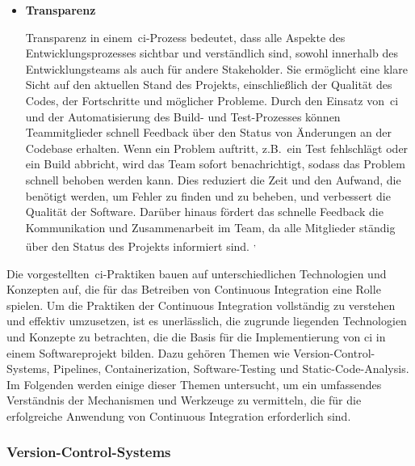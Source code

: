 \begin{itemize}
    \item {
        \textbf{Transparenz}\par
        Transparenz in einem\ \acrshort{ci}-Prozess bedeutet, dass alle Aspekte des Entwicklungsprozesses sichtbar und
        verständlich sind, sowohl innerhalb des Entwicklungsteams als auch für andere Stakeholder.
        Sie ermöglicht eine klare Sicht auf den aktuellen Stand des Projekts, einschließlich der Qualität des Codes,
        der Fortschritte und möglicher Probleme.
        Durch den Einsatz von\ \acrshort{ci} und der Automatisierung des Build- und Test-Prozesses können Teammitglieder
        schnell Feedback über den Status von Änderungen an der Codebase erhalten.
        Wenn ein Problem auftritt, z.B.\ ein Test fehlschlägt oder ein Build abbricht, wird das Team sofort
        benachrichtigt, sodass das Problem schnell behoben werden kann.
        Dies reduziert die Zeit und den Aufwand, die benötigt werden, um Fehler zu finden und zu beheben, und verbessert
        die Qualität der Software.
        Darüber hinaus fördert das schnelle Feedback die Kommunikation und Zusammenarbeit im Team, da alle Mitglieder
        ständig über den Status des Projekts informiert sind.
        \textsuperscript{,}
    }
\end{itemize}

Die vorgestellten\ \acrshort{ci}-Praktiken bauen auf unterschiedlichen Technologien und Konzepten auf, die für das
Betreiben von Continuous Integration eine Rolle spielen.
Um die Praktiken der Continuous Integration vollständig zu verstehen und effektiv umzusetzen, ist es
unerlässlich, die zugrunde liegenden Technologien und Konzepte zu betrachten, die die Basis für die Implementierung von
\acrshort{ci} in einem Softwareprojekt bilden.
Dazu gehören Themen wie Version-Control-Systems, Pipelines, Containerization, Software-Testing und
Static-Code-Analysis.
Im Folgenden werden einige dieser Themen untersucht, um ein umfassendes Verständnis der Mechanismen und Werkzeuge zu
vermitteln, die für die erfolgreiche Anwendung von Continuous Integration erforderlich sind.

\subsubsection{Version-Control-Systems}

